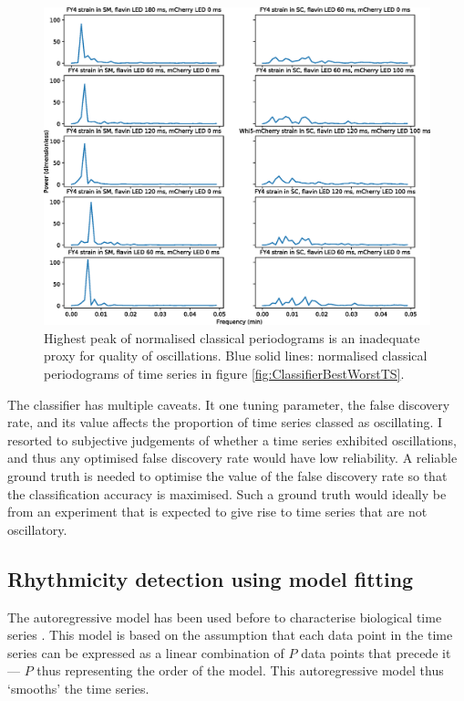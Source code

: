 \begin{figure}[htbp]
  \centering
  \includegraphics[width=\textwidth]{10m_ClassifierBestWorstPS}
  \caption{
    Highest peak of normalised classical periodograms is an inadequate proxy for quality of oscillations.
    Blue solid lines: normalised classical periodograms of time series in figure \ref{fig:ClassifierBestWorstTS}.
  }
  \label{fig:ClassifierBestWorstPS}
\end{figure}

The classifier has multiple caveats.
It one tuning parameter, the false discovery rate, and its value affects the proportion of time series classed as oscillating.
I resorted to subjective judgements of whether a time series exhibited oscillations, and thus any optimised false discovery rate would have low reliability.
A reliable ground truth is needed to optimise the value of the false discovery rate so that the classification accuracy is maximised.
Such a ground truth would ideally be from an experiment that is expected to give rise to time series that are not oscillatory.

\subsection{Rhythmicity detection using model fitting}
\label{subsec:analysis-classification-ar}

The autoregressive model has been used before to characterise biological time series \parencite{zielinskiStrengthsLimitationsPeriod2014}.
This model is based on the assumption that each data point in the time series can be expressed as a linear combination of $P$ data points that precede it --- $P$ thus representing the order of the model.
This autoregressive model thus `smooths' the time series.

